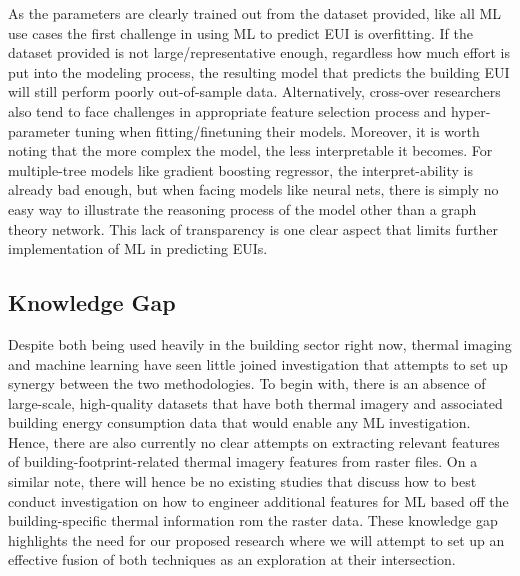 \documentclass[preprint,12pt]{elsarticle}
\begin{document}
        As the parameters are clearly trained out from the dataset provided, like all ML use cases the first challenge in using ML to predict EUI is overfitting. If the dataset provided is not large/representative enough, regardless how much effort is put into the modeling process, the resulting model that predicts the building EUI will still perform poorly out-of-sample data\cite{amasyali_review_2018,seyedzadeh_machine_2018}. Alternatively, cross-over researchers also tend to face challenges in appropriate feature selection process and hyper-parameter tuning\cite{touzani_gradient_2018} when fitting/finetuning their models. Moreover, it is worth noting that the more complex the model, the less interpretable it becomes. For multiple-tree models like gradient boosting regressor, the interpret-ability is already bad enough, but when facing models like neural nets, there is simply no easy way to illustrate the reasoning process of the model other than a graph theory network\cite{wang_novel_2018}. This lack of transparency is one clear aspect that limits further implementation of ML in predicting EUIs.
        
    \subsection{Knowledge Gap}%
        Despite both being used heavily in the building sector right now, thermal imaging and machine learning have seen little joined investigation that attempts to set up synergy between the two methodologies. To begin with, there is an absence of large-scale, high-quality datasets that have both thermal imagery and associated building energy consumption data that would enable any ML investigation\cite{amasyali_review_2018}. Hence, there are also currently no clear attempts on extracting relevant features of building-footprint-related thermal imagery features from raster files. On a similar note, there will hence be no existing studies that discuss how to best conduct investigation on how to engineer additional features for ML based off the building-specific thermal information rom the raster data. These knowledge gap highlights the need for our proposed research where we will attempt to set up an effective fusion of both techniques as an exploration at their intersection.  
\end{document}
